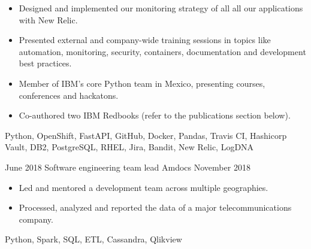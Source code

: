 \begin{experiences}
{\begin{itemize}
                    team's throughput while reducing the error rates and migrating 
                    from an IaaS architecture to a cloud and container-based 
                    architecture.
                \item Designed and implemented our monitoring strategy of all
                    all our applications with New Relic.
				\item Presented external and company-wide training sessions in 
                    topics like automation, monitoring, security, containers, documentation 
                    and development best practices.
                \item Member of IBM's core Python team in Mexico, presenting
                    courses, conferences and hackatons.
                \item Co-authored two IBM Redbooks (refer to the publications section below).
            \end{itemize}
        }
        {
            Python,
            OpenShift,
            FastAPI,
            GitHub,
            Docker,
            Pandas,
            Travis CI,
            Hashicorp Vault,
            DB2,
            PostgreSQL,
            RHEL,
            Jira,
            Bandit,
            New Relic,
            LogDNA
        }

    \emptySeparator

    \experience
        {June 2018}
        {Software engineering team lead}
        {Amdocs}
        {November 2018}
        {
            \begin{itemize}
                \item Led and mentored a development team across multiple 
                geographies.
                \item Processed, analyzed and reported 
                the data of a major telecommunications company.
            \end{itemize}
        }
        {
            Python,
            Spark,
            SQL,
            ETL,
            Cassandra,
            Qlikview
        }

    \emptySeparator


\end{experiences}
